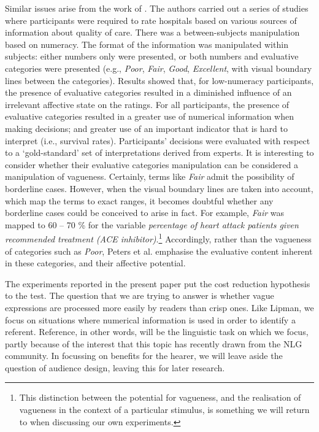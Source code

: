 \documentclass[doc,floatmark]{apa}
\begin{document}
Similar issues arise from the work of . The authors carried out a series of studies where participants were required to rate hospitals based on various sources of information about quality of care. There was a between-subjects manipulation based on numeracy. The format of the information was manipulated within subjects: either numbers only were presented, or both numbers and evaluative categories were presented (e.g., \emph{Poor}, \emph{Fair}, \emph{Good}, \emph{Excellent}, with visual boundary lines between the categories). Results showed that, for low-numeracy participants, the presence of evaluative categories resulted in a diminished influence of an irrelevant affective state on the ratings. For all participants, the presence of evaluative categories resulted in a greater use of numerical information when making decisions; and greater use of an important indicator that is hard to interpret (i.e., survival rates). Participants' decisions were evaluated with respect to a `gold-standard' set of interpretations derived from experts. It is interesting to consider whether their evaluative categories manipulation can be considered a manipulation of vagueness. Certainly, terms like \emph{Fair} admit the possibility of borderline cases. However, when the visual boundary lines are taken into account, which map the terms to exact ranges,  it becomes doubtful whether any borderline cases could be conceived to arise in fact. For example,  \emph{Fair} was mapped to 60 -- 70 \% for the variable \emph{percentage of heart attack patients given recommended treatment (ACE inhibitor)}.\footnote{This distinction between the potential for vagueness, and the realisation of vagueness in the context of a particular stimulus, is something we will return to when discussing our own experiments.} Accordingly, rather than the vagueness of categories such as \emph{Poor}, Peters et al. emphasise the evaluative content inherent in these categories, and their affective potential.

The experiments reported in the present paper put the cost reduction hypothesis to the test. The question that we are trying to answer is whether vague expressions are processed more easily by readers than crisp ones. Like Lipman, we focus on situations where numerical information is used in order to identify a referent. Reference, in other words, will be the linguistic task on which we focus, partly because of the interest that this topic has recently drawn from the NLG community.  In focussing on benefits for the hearer, we will leave aside the question of audience design, leaving this for later research.
\end{document}
